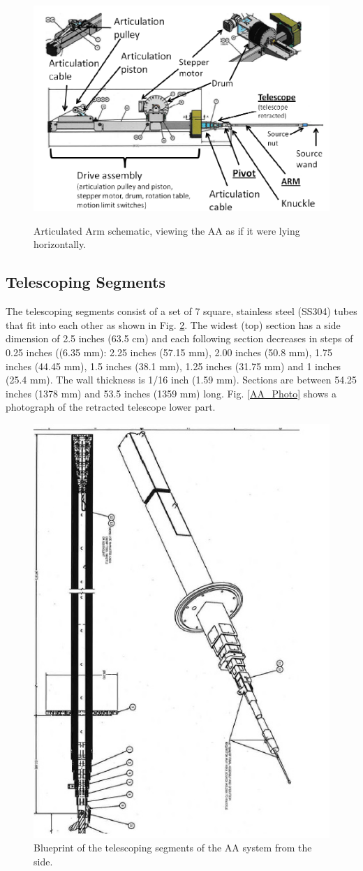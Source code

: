 \begin{figure}
\caption{Articulated Arm schematic, viewing the AA as if it were lying horizontally.}
\centering
\includegraphics[width=\textwidth]{AA/AA_Schematic.jpg}
\label{AA_Schem}
\end{figure}

\subsection{Telescoping Segments}
The telescoping segments consist of a set of 7 square, stainless steel (SS304) tubes that fit into each other as shown in Fig. \ref{Telescoping Segments}. The widest (top) section has a side dimension of 2.5 inches (63.5 cm) and each following section decreases in steps of 0.25 inches ((6.35 mm): 2.25 inches (57.15 mm), 2.00 inches (50.8 mm), 1.75 inches (44.45 mm), 1.5 inches (38.1 mm), 1.25 inches (31.75 mm) and 1 inches (25.4 mm). The wall thickness is 1/16 inch (1.59 mm). Sections are between 54.25 inches (1378 mm) and 53.5 inches (1359 mm) long. Fig. \ref{AA_Photo} shows a photograph of the retracted telescope lower part.

\begin{figure}
\includegraphics[width=.5 \textwidth]{AA/Telescoping_Segments.jpg}
\caption{Blueprint of the telescoping segments of the AA system from the side.}
\label{Telescoping Segments}
\end{figure}

